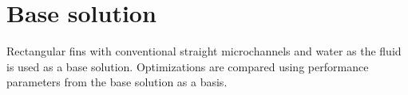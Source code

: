 \documentclass[../main.tex]{subfiles}
\begin{document}
\section{Base solution}

Rectangular fins with conventional straight microchannels and water as the fluid
is used as a base solution. Optimizations are compared using performance parameters from the base solution as a basis. 
\end{document}
